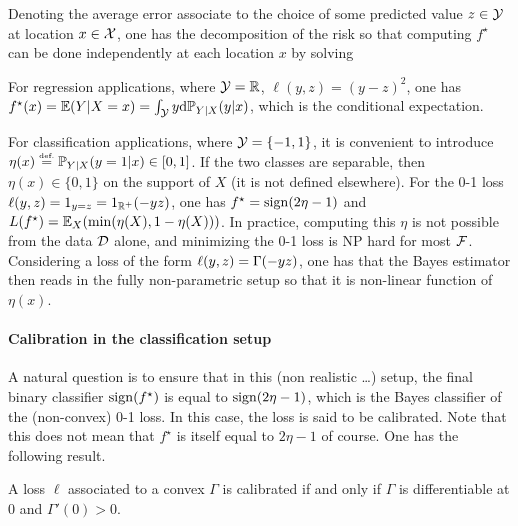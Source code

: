 Denoting 
the average error associate to the choice of some predicted value $z \in \mathcal{Y}$ at location $x \in \mathcal{X}$, one has the decomposition of the risk
so that computing $f^\star$ can be done independently at each location $x$ by solving

\begin{exmp}[Regression]
For regression applications, where $\mathcal{Y}=\mathbb{R}$, $\ell(y,z) = (y-z)^2$, one has $f^\star(x)=\mathbb{E}(Y|X=x) = \int_{\mathcal{Y}} y \mathrm{d} \mathbb{P}_{Y|X}(y|x)$, which is the conditional expectation.
\end{exmp}

\begin{exmp}[Classification]
For classification applications, where $\mathcal{Y} = \{-1,1\}$, it is convenient to introduce $\eta(x) \stackrel{\mbox{\upshape\tiny def.}}{=} \mathbb{P}_{Y|X}(y=1|x) \in [0,1]$.
%
If the two classes are separable, then $\eta(x) \in \{0,1\}$ on the support of $X$ (it is not defined elsewhere). 
%
For the 0-1 loss $\ell(y,z)=1_{y=z}=1_{\mathbb{R}^+}(-yz)$, one has $f^\star = \operatorname{sign}(2\eta-1)$ and $L(f^\star) = \mathbb{E}_X( \min(\eta(X),1-\eta(X)) )$.
%
In practice, computing this $\eta$ is not possible from the data $\mathcal{D}$ alone, and minimizing the 0-1 loss is NP hard for most $\mathcal{F}$. 
%
Considering a loss of the form $\ell(y,z)=\Gamma(-yz)$, one has that the Bayes estimator then reads in the fully non-parametric setup
so that it is non-linear function of $\eta(x)$.
\end{exmp}

\paragraph{Calibration in the classification setup}

A natural question is to ensure that in this (non realistic \ldots) setup, the final binary classifier $\operatorname{sign}(f^\star)$ is equal to $\operatorname{sign}(2\eta-1)$, which is the Bayes classifier of the (non-convex) 0-1 loss. In this case, the loss is said to be calibrated. Note that this does not mean that $f^\star$ is itself equal to $2\eta-1$ of course.  One has the following result.

\begin{prop}
	A loss  $\ell$ associated to a convex $\Gamma$ is calibrated if and only if $\Gamma$ is differentiable at $0$ and $\Gamma'(0)>0$.
\end{prop}

